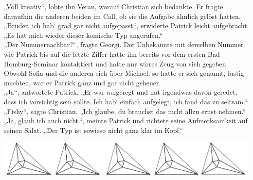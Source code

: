 \documentclass[oneside]{memoir}
\newcommand{\parasep}{
\bigskip
\bigskip
\begin{center} 
   \includegraphics[scale=.08]{parasep5.jpg} 
\end{center}
\bigskip
\bigskip
}
\begin{document}
„Voll kreativ“, lobte ihn Veran, worauf Christian sich bedankte. Er fragte daraufhin die anderen beiden im Call, ob sie die Aufgabe ähnlich gelöst hatten. \\
„Bruder, ich hab‘ grad gar nicht aufgepasst“, erwiderte Patrick leicht aufgebracht. „Es hat mich wieder dieser komische Typ angerufen.“ \\
„Der Nummernachbar?“, fragte Georgi. Der Unbekannte mit derselben Nummer wie Patrick bis auf die letzte Ziffer hatte ihn bereits vor dem ersten Bad Homburg-Seminar kontaktiert und hatte nur wirres Zeug von sich gegeben. Obwohl Sofia und die anderen sich über Michael, so hatte er sich genannt, lustig machten, war er Patrick ganz und gar nicht geheuer. \\
„Ja“, antwortete Patrick. „Er war aufgeregt und hat irgendwas davon geredet, dass ich vorsichtig sein sollte. Ich hab‘ einfach aufgelegt, ich fand das zu seltsam.“ \\
„Fishy“, sagte Christian. „Ich glaube, du brauchst das nicht allzu ernst nehmen.“ \\
„Ja, glaub ich auch nicht.“, meinte Patrick und richtete seine Aufmerksamkeit auf seinen Salat. „Der Typ ist sowieso nicht ganz klar im Kopf.“

\parasep
\end{document}
